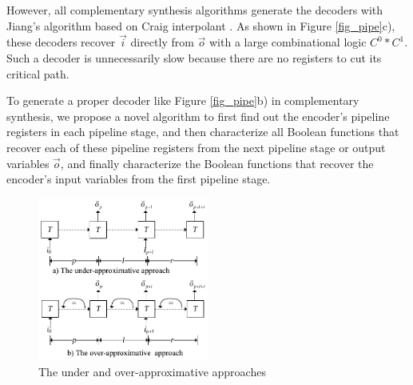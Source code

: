 \documentclass[twocolumn]{article}
\begin{document}
However,
all complementary synthesis algorithms \cite{ShenTCAD10,ShenTCAD11,ShenTCAD12,LiuICCAD11,LiuTCAD12,TuDAC13}
generate the decoders with Jiang's algorithm \cite{InterpBoolFunction} 
based on Craig interpolant \cite{Craig}.
As shown in Figure \ref{fig_pipe}c),
these decoders recover $\vec{i}$ directly from $\vec{o}$ 
with a large combinational logic $C^0*C^1$.
Such a decoder is unnecessarily slow because 
there are no registers to cut its critical path.


To generate a proper decoder like Figure \ref{fig_pipe}b) in complementary synthesis,
we propose a novel algorithm to first find out the encoder's pipeline registers in each pipeline stage,
and then characterize all Boolean functions that recover each of these pipeline registers
from the next pipeline stage or output variables $\vec{o}$,
and finally characterize the Boolean functions that recover the encoder's input variables 
from the first pipeline stage.

\begin{figure}[t]
\begin{center}
\includegraphics[width=0.5\textwidth]{pcln}
\end{center}
\caption{The under and over-approximative approaches}
  \label{fig_pc}
\end{figure}
\end{document}
